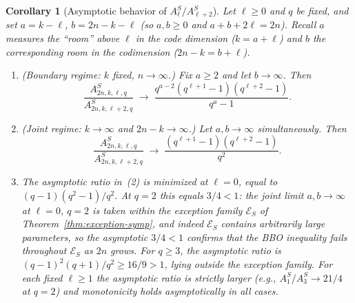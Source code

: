 \documentclass[10pt,a4paper]{amsart}
\newtheorem{corollary}[theorem]{Corollary}
\begin{document}
\begin{corollary}[Asymptotic behavior of $A^S_\ell / A^S_{\ell+2}$]\label{cor:alpha-symp-asym}
Let $\ell \geq 0$ and $q$ be fixed, and set $a = k - \ell$, $b = 2n - k - \ell$
(so $a, b \geq 0$ and $a + b + 2\ell = 2n$). Recall $a$ measures the
``room'' above $\ell$ in the code dimension ($k = a + \ell$) and $b$ the
corresponding room in the codimension ($2n - k = b + \ell$).
\begin{enumerate}
\item (\emph{Boundary regime: $k$ fixed, $n \to \infty$.})
Fix $a \geq 2$ and let $b \to \infty$. Then
\[
  \frac{A^S_{2n,k,\ell,q}}{A^S_{2n,k,\ell+2,q}}
  \;\longrightarrow\; \frac{q^{a-2}(q^{\ell+1}-1)(q^{\ell+2}-1)}{q^a - 1}.
\]
\item (\emph{Joint regime: $k \to \infty$ and $2n - k \to \infty$.})
Let $a, b \to \infty$ simultaneously. Then
\[
  \frac{A^S_{2n,k,\ell,q}}{A^S_{2n,k,\ell+2,q}}
  \;\longrightarrow\; \frac{(q^{\ell+1}-1)(q^{\ell+2}-1)}{q^2}.
\]
\item The asymptotic ratio in~(2) is minimized at $\ell = 0$, equal to
$(q-1)(q^2-1)/q^2$. At $q = 2$ this equals $3/4 < 1$: the joint limit
$a, b \to \infty$ at $\ell = 0$, $q = 2$ is taken within the exception
family $\mathcal{E}_S$ of Theorem~\ref{thm:exception-symp}, and indeed
$\mathcal{E}_S$ contains arbitrarily large parameters, so the asymptotic
$3/4 < 1$ confirms that the BBO inequality fails throughout $\mathcal{E}_S$
as $2n$ grows. For $q \geq 3$, the asymptotic ratio is
$(q-1)^2(q+1)/q^2 \geq 16/9 > 1$, lying outside the exception family.
For each fixed $\ell \geq 1$ the asymptotic ratio is strictly larger (e.g.,
$A^S_1/A^S_3 \to 21/4$ at $q = 2$) and monotonicity holds asymptotically
in all cases.
\end{enumerate}
\end{corollary}
\end{document}
